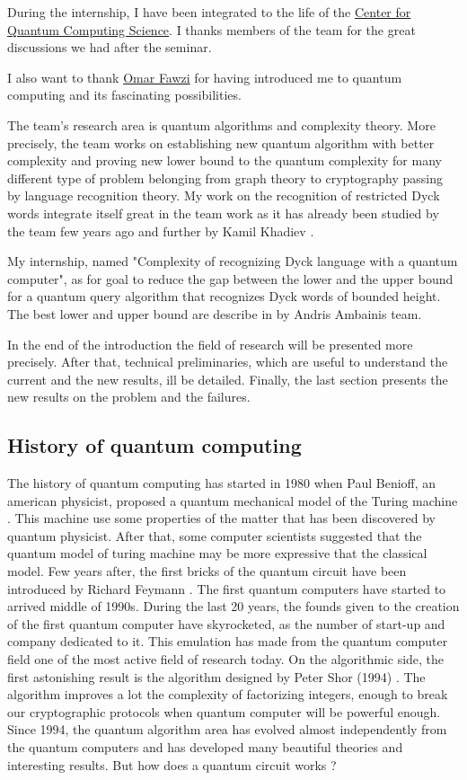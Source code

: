 \documentclass[11pt,a4paper]{article}
\theoremstyle{definition}
\theoremstyle{plain}
\theoremstyle{definition}
\begin{document}
During the internship, I have been integrated to the life of the
\href{https://quantum.lu.lv/}{Center for Quantum Computing Science}.
I thanks members of the team for the great discussions we had after
the seminar.

I also want to thank \href{https://perso.ens-lyon.fr/omar.fawzi/}{Omar Fawzi} for
having introduced me to quantum computing and its fascinating possibilities.

The team's research area is quantum algorithms and complexity theory. More precisely,
the team works on establishing new quantum algorithm with better complexity and proving
new lower bound to the quantum complexity for many different type of problem belonging
from graph theory to cryptography passing by language  recognition theory. My work on
the recognition of restricted Dyck words integrate itself great in the team work as it
has already been studied by the team few years ago \cite{art:2DGrid} and further by
Kamil Khadiev \cite{DBLP:conf/uc/KhadievK21}.

My internship, named "Complexity of recognizing Dyck language with a
quantum computer", as for goal to reduce the gap between the lower and the upper bound for
a quantum query algorithm that recognizes Dyck words of bounded height. The best
lower and upper bound are describe in \cite{art:2DGrid} by Andris Ambainis team.

In the end of the introduction the field of research will be presented more precisely.
After that, technical preliminaries, which are useful to understand the
current and the new results, ill be detailed. Finally, the last section presents the
new results on the problem and the failures.

\subsection{History of quantum computing}

The history of quantum computing has started in 1980 when Paul Benioff, an american physicist,
proposed a quantum mechanical model of the Turing machine \cite{art:paulbenioff}.
This machine use some properties
of the matter that has been discovered by quantum physicist. After that, some computer
scientists suggested that the quantum model of turing machine may be more expressive that the
classical model. Few years after, the first bricks of the quantum circuit have been introduced
by Richard Feymann \cite{art:feymann}. The first quantum computers have started to arrived middle
of 1990s. During the last 20 years, the founds given to the creation of the first quantum computer
have skyrocketed, as the number of start-up and company dedicated to it. This emulation has made
from the quantum computer
field one of the most active field of research today. On the algorithmic side, the first
astonishing result is the algorithm designed by Peter Shor (1994) \cite{art:shor}. The
algorithm improves a lot the complexity of factorizing integers, enough to break our
cryptographic protocols when quantum computer will be powerful enough. Since 1994, the
quantum algorithm area has evolved almost independently from the quantum computers and
has developed many beautiful theories and interesting results. But how does a quantum
circuit works ?
\end{document}
